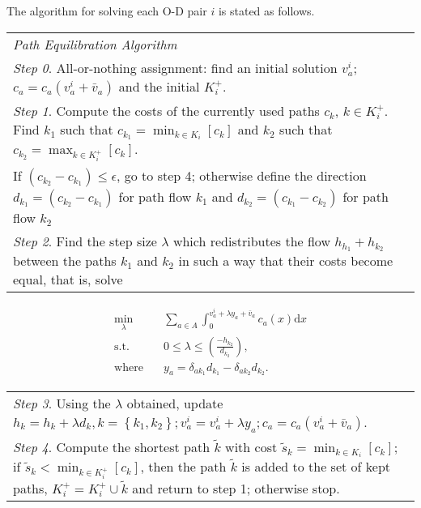 The algorithm for solving each O-D pair $i$ is stated as follows.
\begin{table}[H]
    \begin{tabular}{ m{} }
        \hspace{-.5cm}\emph{Path Equilibration Algorithm \citep{Florian}} \\
        \emph{Step 0}. All-or-nothing assignment: find an initial solution $v_a^i$; $c_a = c_a(v_a^i+\bar{v}_a)$ and the initial $K_i^+$.\\
        \emph{Step 1}. Compute the costs of the currently used paths $c_k$, $k \in K_i^+$. Find $k_1$ such that $c_{k_1} = \displaystyle \min_{k \in K_i} \left[ c_k \right]$ and $k_2$ such that $c_{k_2} = \displaystyle \max_{k \in K_i^+} \left[c_k \right]$.\\
        If $(c_{k_2} - c_{k_1}) \leq \epsilon$, go to step 4;
        otherwise define the direction $d_{k_1} = (c_{k_2} - c_{k_1})$ for path flow $k_1$ and $d_{k_2} = (c_{k_1} - c_{k_2})$ for path flow $k_2$\\
        \emph{Step 2}. Find the step size $\lambda$ which redistributes the flow $h_{h_1} + h_{k_2}$ between the paths $k_1$ and $k_2$ in such a way that their costs become equal, that is, solve
    \end{tabular}
\end{table}
\vspace{-3em}
\begin{align}
    \min_\lambda & \quad \sum_{a \in A} \int_0^{v_a^i + \lambda y_a + \bar{v}_a} c_a(x) \mathrm{d}x \\
    \text{s.t.} & \quad 0 \leq \lambda \leq \left( \frac{-h_{k_2}}{d_{k_2}} \right), \\
    \text{where} & \quad y_a = \delta_{ak_1} d_{k_1} - \delta_{ak_2} d_{k_2}.
\end{align}
\vspace{-2em}
\begin{table}[H]
    \begin{tabular}{ m{} }
        \emph{Step 3}. Using the $\lambda$ obtained, update $h_k = h_k + \lambda d_k, k = \left\{ k_1, k_2 \right\}; v_a^i = v_a^i + \lambda y_a; c_a = c_a(v_a^i + \bar{v}_a)$. \\
        \emph{Step 4}. Compute the shortest path $\tilde{k}$ with cost $\tilde{s}_k = \displaystyle \min_{k \in K_i} \left[ c_k \right]$;
        if $\tilde{s}_k < \displaystyle \min_{k \in K_i^+} \left[ c_k \right]$, then the path $\tilde{k}$ is added to the set of kept paths, $K_i^+ = K_i^+ \cup \tilde{k}$ and return to step 1; otherwise stop.
    \end{tabular}
\end{table}


